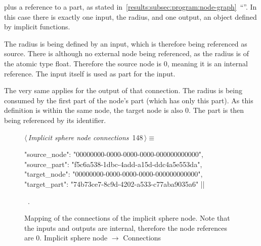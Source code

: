 \documentclass[%
    a4paper,    %
    justified,  %
    nobib,      %
    openany     %
]{tufte-book}
\makeatletter
\renewcommand{\label}[1]{\@tufte@label{##1}}%
\makeatother
\begin{document}
 plus a reference
to a part, as stated
in~\autoref{results:subsec:program:node-graph}~\enquote{}.
In this case there is exactly one input, the radius, and one output, an object
defined by implicit functions.

The radius is being defined by an input, which is therefore being referenced as
source. There is although no external node being referenced, as the radius is
of the atomic type float. Therefore the source node is 0, meaning it is an
internal reference. The input itself is used as part for the input.

The very same applies for the output of that connection. The radius is being
consumed by the first part of the node's part (which has only this part). As
this definition is within the same node, the target node is also 0. The part is
then being referenced by its identifier.

\begin{figure}[!htbp]
\begin{flushleft} \small
\begin{minipage}{\linewidth}\label{scrap104}\raggedright\small
{} $\langle\,${\itshape Implicit sphere node connections}\nobreak\ {\footnotesize {148}}$\,\rangle\equiv$
\vspace{-1ex}
\begin{pythoncode}
{
    "source_node": "00000000-0000-0000-0000-000000000000",
    "source_part": "f5c6a538-1dbc-4add-a15d-ddc4a5e553da",
    "target_node": "00000000-0000-0000-0000-000000000000",
    "target_part": "74b73ce7-8c9d-4202-a533-c77aba9035a6"
}|\NWsep|
\end{pythoncode}
\vspace{1.5ex}
\footnotesize
\begin{list}{}{\setlength{\itemsep}{-\parsep}\setlength{\itemindent}{-\leftmargin}}
\item \NWtxtMacroRefIn\ .

\item{}
\end{list}
\end{minipage}\vspace{4ex}
\end{flushleft}
\caption{Mapping of the connections of the implicit sphere node. Note that the
  inputs and outputs are internal, therefore the node references are 0.
  \newline{}\newline{}Implicit sphere node $\rightarrow$ Connections}
\end{figure}
\end{document}
